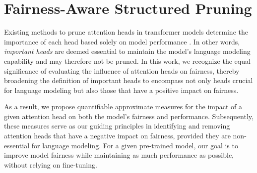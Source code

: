 \documentclass[letterpaper]{article} %
\begin{document}
\section{Fairness-Aware Structured Pruning}

Existing methods to prune attention heads in transformer models determine the importance of each head based solely on model performance \cite{voita-etal-2019-analyzing,NEURIPS2019_2c601ad9}. In other words, \textit{important heads} are deemed essential to maintain the model's language modeling capability and may therefore not be pruned. In this work, we recognize the equal significance of evaluating the influence of attention heads on fairness, thereby broadening the definition of important heads to encompass not only heads crucial for language modeling but also those that have a positive impact on fairness.

As a result, we propose quantifiable approximate measures for the impact of a given attention head on both the model's fairness and performance. Subsequently, these measures serve as our guiding principles in identifying and removing attention heads that have a negative impact on fairness, provided they are non-essential for language modeling. %
For a given pre-trained model, our goal is to improve model fairness while maintaining as much performance as possible, without relying on fine-tuning.
\end{document}
